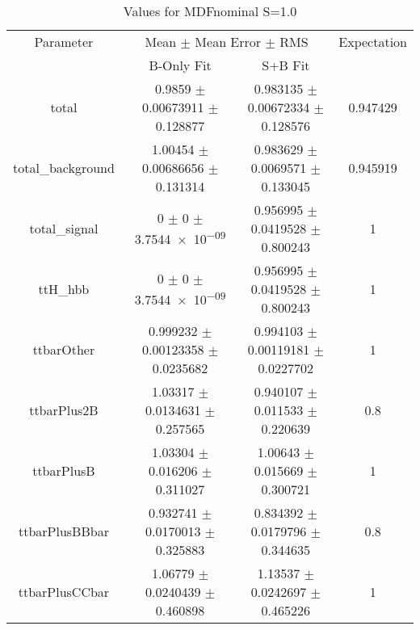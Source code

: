 \begin{table}
\centering
\caption{Values for MDFnominal S=1.0}
\begin{tabular}{cccc}
\toprule
Parameter & \multicolumn{2}{c}{Mean $\pm$ Mean Error $\pm$ RMS} & Expectation\\
 & B-Only Fit & S+B Fit & \\
\midrule
total & \num{0.9859} $\pm$ \num{0.00673911} $\pm$ \num{0.128877} & \num{0.983135} $\pm$ \num{0.00672334} $\pm$ \num{0.128576} & \num{0.947429}\\
total\_background & \num{1.00454} $\pm$ \num{0.00686656} $\pm$ \num{0.131314} & \num{0.983629} $\pm$ \num{0.0069571} $\pm$ \num{0.133045} & \num{0.945919}\\
total\_signal & \num{0} $\pm$ \num{0} $\pm$ \num{3.7544e-09} & \num{0.956995} $\pm$ \num{0.0419528} $\pm$ \num{0.800243} & \num{1}\\
ttH\_hbb & \num{0} $\pm$ \num{0} $\pm$ \num{3.7544e-09} & \num{0.956995} $\pm$ \num{0.0419528} $\pm$ \num{0.800243} & \num{1}\\
ttbarOther & \num{0.999232} $\pm$ \num{0.00123358} $\pm$ \num{0.0235682} & \num{0.994103} $\pm$ \num{0.00119181} $\pm$ \num{0.0227702} & \num{1}\\
ttbarPlus2B & \num{1.03317} $\pm$ \num{0.0134631} $\pm$ \num{0.257565} & \num{0.940107} $\pm$ \num{0.011533} $\pm$ \num{0.220639} & \num{0.8}\\
ttbarPlusB & \num{1.03304} $\pm$ \num{0.016206} $\pm$ \num{0.311027} & \num{1.00643} $\pm$ \num{0.015669} $\pm$ \num{0.300721} & \num{1}\\
ttbarPlusBBbar & \num{0.932741} $\pm$ \num{0.0170013} $\pm$ \num{0.325883} & \num{0.834392} $\pm$ \num{0.0179796} $\pm$ \num{0.344635} & \num{0.8}\\
ttbarPlusCCbar & \num{1.06779} $\pm$ \num{0.0240439} $\pm$ \num{0.460898} & \num{1.13537} $\pm$ \num{0.0242697} $\pm$ \num{0.465226} & \num{1}\\
\bottomrule
\end{tabular}
\end{table}